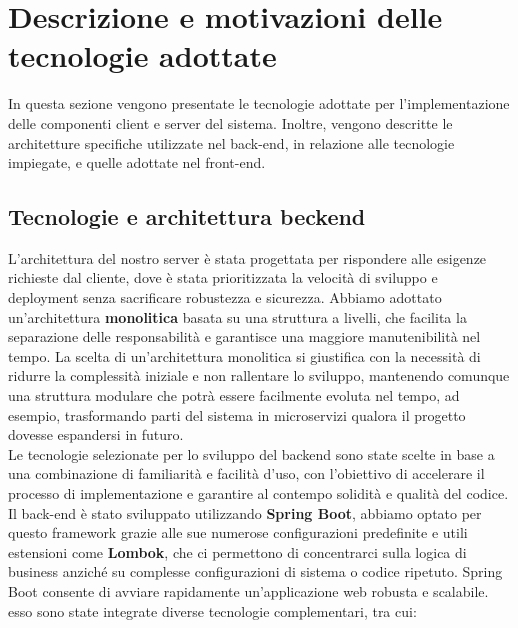 \section{Descrizione e motivazioni delle tecnologie adottate }
In questa sezione vengono presentate le tecnologie adottate per l’implementazione delle componenti client e server del sistema.
Inoltre, vengono descritte le architetture specifiche utilizzate nel back-end, in relazione alle tecnologie impiegate, e quelle adottate nel front-end.

\subsection{Tecnologie e architettura beckend}
L'architettura del nostro server è stata progettata per rispondere alle esigenze richieste dal cliente, dove è stata prioritizzata la velocità di sviluppo e deployment senza sacrificare robustezza e sicurezza. Abbiamo adottato un'architettura \textbf{monolitica} basata su una struttura a livelli, che facilita la separazione delle responsabilità e garantisce una maggiore manutenibilità nel tempo. La scelta di un'architettura monolitica si giustifica con la necessità di ridurre la complessità iniziale e non rallentare lo sviluppo, mantenendo comunque una struttura modulare che potrà essere facilmente evoluta nel tempo, ad esempio, trasformando parti del sistema in microservizi qualora il progetto dovesse espandersi in futuro.
\\
Le tecnologie selezionate per lo sviluppo del backend sono state scelte in base a una combinazione di familiarità e facilità d'uso, con l'obiettivo di accelerare il processo di implementazione e garantire al contempo solidità e qualità del codice.
\\
Il back-end è stato sviluppato utilizzando \textbf{Spring Boot}, abbiamo optato per questo framework grazie alle sue numerose configurazioni predefinite e utili estensioni come \textbf{Lombok}, che ci permettono di concentrarci sulla logica di business anziché su complesse configurazioni di sistema o codice ripetuto. Spring Boot consente di avviare rapidamente un'applicazione web robusta e scalabile.
esso sono state integrate diverse tecnologie complementari, tra cui:

